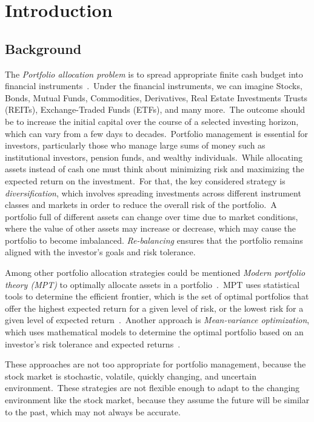 \documentclass[../xlapes02]{subfiles}
\begin{document}
    \chapter{Introduction}\label{ch:introduction}


    \section{Background}\label{sec:background}
    The \emph{Portfolio allocation problem} is to spread appropriate finite cash budget into financial instruments~\cite{Model-Free-Reinforcement-Learning-for-Asset-Allocation}.\ Under the financial instruments, we can imagine Stocks, Bonds, Mutual Funds, Commodities, Derivatives, Real Estate Investments Trusts (REITs), Exchange-Traded Funds (ETFs), and many more.\ The outcome should be to increase the initial capital over the course of a selected investing horizon, which can vary from a few days to decades.\ Portfolio management is essential for investors, particularly those who manage large sums of money such as institutional investors, pension funds, and wealthy individuals.\ While allocating assets instead of cash one must think about minimizing risk and maximizing the expected return on the investment.\ For that, the key considered strategy is \emph{diversification}, which involves spreading investments across different instrument classes and markets in order to reduce the overall risk of the portfolio.\ A portfolio full of different assets can change over time due to market conditions, where the value of other assets may increase or decrease, which may cause the portfolio to become imbalanced. \emph{Re-balancing} ensures that the portfolio remains aligned with the investor's goals and risk tolerance.

    Among other portfolio allocation strategies could be mentioned \emph{Modern portfolio theory (MPT)} to optimally allocate assets in a portfolio~\cite{enwiki:1043516653}.\ MPT uses statistical tools to determine the efficient frontier, which is the set of optimal portfolios that offer the highest expected return for a given level of risk, or the lowest risk for a given level of expected return~\cite{sirucek-2015}.\ Another approach is \emph{Mean-variance optimization}, which uses mathematical models to determine the optimal portfolio based on an investor's risk tolerance and expected returns~\cite{meanvarianceportfoliooptimazation}.

    These approaches are not too appropriate for portfolio management, because the stock market is stochastic, volatile, quickly changing, and uncertain environment.\ These strategies are not flexible enough to adapt to the changing environment like the stock market, because they assume the future will be similar to the past, which may not always be accurate.
\end{document}
